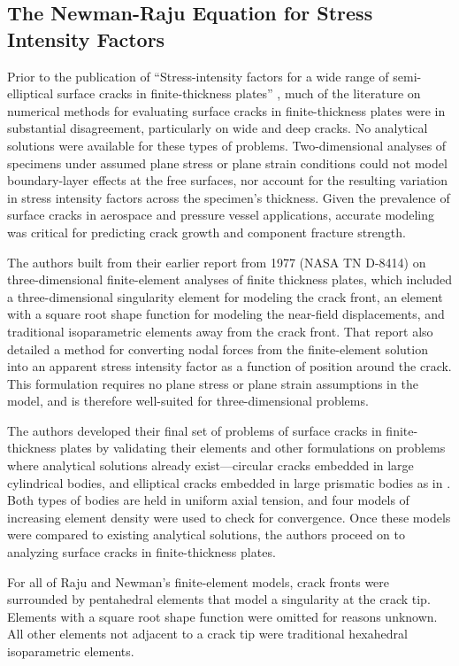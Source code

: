 \subsection{The Newman-Raju Equation for Stress Intensity Factors}

Prior to the publication of ``Stress-intensity factors for a wide range of semi-elliptical surface cracks in finite-thickness plates'' \citep{rajunewman1979},
much of the literature on numerical methods for evaluating surface cracks in finite-thickness plates were in substantial disagreement, particularly on wide and deep cracks.
No analytical solutions were available for these types of problems.
Two-dimensional analyses of specimens under assumed plane stress or plane strain conditions could not model bound\-ary-layer effects at the free surfaces, nor account for the resulting variation in stress intensity factors across the specimen's thickness.
Given the prevalence of surface cracks in aerospace and pressure vessel applications, accurate modeling was critical for predicting crack growth and component fracture strength.

The authors built from their earlier report from 1977 (NASA TN D-8414) on three-dimensional finite-element analyses of finite thickness plates, which included a three-dimensional singularity element for modeling the crack front, an element with a square root shape function for modeling the near-field displacements, and traditional isoparametric elements away from the crack front. That report also detailed a method for converting nodal forces from the finite-element solution into an apparent stress intensity factor as a function of position around the crack. This formulation requires no plane stress or plane strain assumptions in the model, and is therefore well-suited for three-dimensional problems.

The authors developed their final set of problems of surface cracks in finite-thickness plates by validating their elements and other formulations on problems where analytical solutions already exist---circular cracks embedded in large cylindrical bodies, and elliptical cracks embedded in large prismatic bodies as in \cite{greensneddon1950}. Both types of bodies are held in uniform axial tension, and four models of increasing element density were used to check for convergence. Once these models were compared to existing analytical solutions, the authors proceed on to analyzing surface cracks in finite-thickness plates.

For all of Raju and Newman's finite-element models, crack fronts were surrounded by pentahedral elements that model a singularity at the crack tip. Elements with a square root shape function were omitted for reasons unknown. All other elements not adjacent to a crack tip were traditional hexahedral isoparametric elements.

